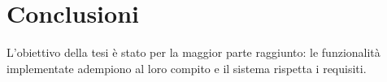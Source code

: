 \section{Conclusioni}
\begin{frame}{}
  L'obiettivo della tesi è stato per la maggior parte raggiunto:
  le funzionalità implementate adempiono al loro compito e il sistema rispetta i requisiti.

\end{frame}

